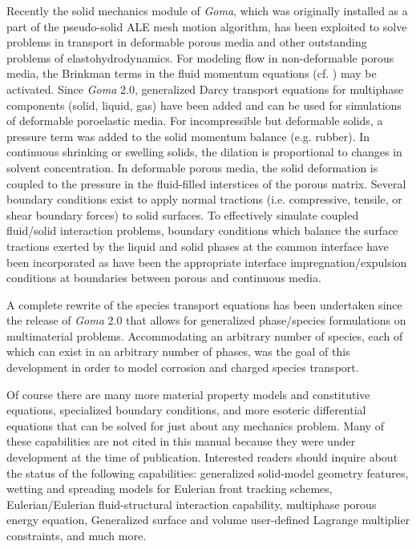 Recently the solid mechanics module of \emph{Goma}, which was originally installed as a part of the
pseudo-solid ALE mesh motion algorithm, has been exploited to solve problems in transport in deformable porous media and other outstanding problems of elastohydrodynamics. For modeling flow in non-deformable porous media, the Brinkman terms in the fluid momentum equations (cf. \citealt{GartlingBrinkman} ) may be activated. Since \emph{Goma} 2.0, generalized Darcy transport equations for multiphase components (solid, liquid, gas) have been added and can be used for simulations of deformable poroelastic media. For incompressible but deformable solids, a pressure term was added to the solid momentum balance (e.g. rubber). In continuous shrinking or swelling solids, the dilation is proportional to changes in solvent concentration. In deformable porous media, the solid deformation is coupled to the pressure in the fluid-filled interstices of the porous matrix. Several boundary conditions exist to apply normal tractions (i.e. compressive, tensile, or shear boundary forces) to solid surfaces. To effectively simulate coupled fluid/solid interaction problems, boundary conditions which balance the surface tractions exerted by the liquid and solid phases at the common interface have been incorporated as have been the appropriate interface impregnation/expulsion conditions at boundaries between porous and continuous media.

A complete rewrite of the species transport equations has been undertaken since the release of \emph{Goma} 2.0 that allows for generalized phase/species formulations on multimaterial problems. Accommodating an arbitrary number of species, each of which can exist in an arbitrary number of phases, was the goal of this development in order to model corrosion and charged species transport.

Of course there are many more material property models and constitutive equations, specialized
boundary conditions, and more esoteric differential equations that can be solved for just about any
mechanics problem. Many of these capabilities are not cited in this manual because they were under development at the time of publication. Interested readers should inquire about the status of the following capabilities: generalized solid-model geometry features, wetting and spreading models for Eulerian front tracking schemes, Eulerian/Eulerian fluid-structural interaction capability, multiphase porous energy equation, Generalized surface and volume user-defined Lagrange multiplier constraints, and much more.
%
%
